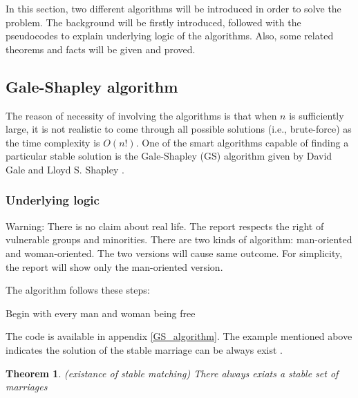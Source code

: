 \documentclass[14pt]{extarticle}
\newtheorem{theorem}{Theorem}
\begin{document}
In this section, two different algorithms will be introduced in order to solve the problem.
The background will be firstly introduced, followed with the pseudocodes to explain underlying logic of the algorithms.
Also, some related theorems and facts will be given and proved.

\subsection{Gale-Shapley algorithm}

The reason of necessity of involving the algorithms is that when $n$ is sufficiently large, it is not realistic to come through all possible solutions (i.e., brute-force) as the time complexity is $O(n!)$. 
One of the smart algorithms capable of finding a particular stable solution is the Gale-Shapley (GS) algorithm given by David Gale and Lloyd S. Shapley \cite{GS1962}.

\subsubsection{Underlying logic}

Warning: There is no claim about real life. The report respects the right of vulnerable groups and minorities. 
There are two kinds of algorithm: man-oriented and woman-oriented. The two versions will cause same outcome. 
For simplicity, the report will show only the man-oriented version. 

The algorithm follows these steps:

\begin{algorithm}[H]
  \SetAlgoLined
  Begin with every man and woman being free\;
\end{algorithm}

The code is available in appendix \ref{GS_algorithm}.
The example mentioned above indicates the solution of the stable marriage can be always exist \cite{GS1962}.
\begin{theorem}
  (existance of stable matching)
  There always exiats a stable set of marriages
\end{theorem}  
\end{document}
